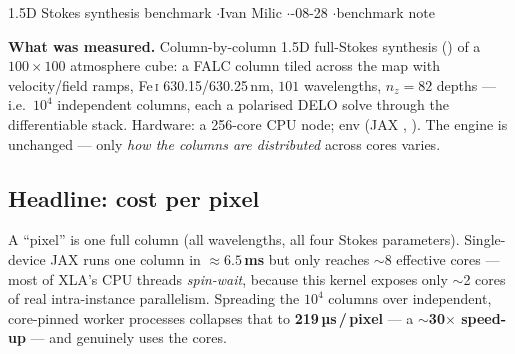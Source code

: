 


%
{1.5D Stokes synthesis benchmark \quad$\cdot$\quad Ivan Milic \quad$\cdot$-08-28 \quad$\cdot$\quad benchmark note}

\textbf{What was measured.} Column-by-column 1.5D full-Stokes synthesis () of a
$100\times100$ atmosphere cube: a FALC column tiled across the map with velocity/field ramps, Fe\,\textsc{i}
630.15/630.25\,nm, $101$ wavelengths, $n_z=82$ depths --- i.e.\ $10^4$ independent columns, each a polarised
DELO solve through the differentiable stack. Hardware: a 256-core CPU node; env 
(JAX , ). The engine is unchanged --- only \emph{how the columns are distributed}
across cores varies.

\subsection*{Headline: cost per pixel}
A ``pixel'' is one full column (all wavelengths, all four Stokes parameters). Single-device JAX runs one
column in \textbf{$\approx6.5$\,ms} but only reaches $\sim$8 effective cores --- most of XLA's CPU threads
\emph{spin-wait}, because this kernel exposes only $\sim$2 cores of real intra-instance parallelism.
Spreading the $10^4$ columns over independent, core-pinned worker processes collapses that to
\textbf{219\,µs\,/\,pixel} --- a \textbf{$\sim$30$\times$ speed-up} --- and genuinely uses the cores.


